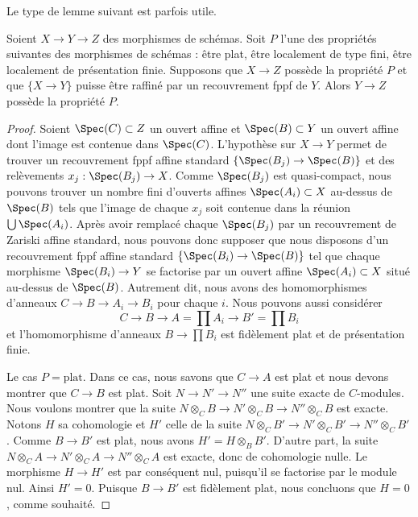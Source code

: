 \noindent
Le type de lemme suivant est parfois utile.

\begin{lemma}
\label{lemma-curiosity}
Soient $X \to Y \to Z$ des morphismes de schémas.
Soit $P$ l'une des propriétés suivantes des morphismes de schémas :
être plat, être localement de type fini, être localement de présentation
finie. Supposons que $X \to Z$ possède la propriété $P$ et que
$\{X \to Y\}$ puisse être raffiné par un recouvrement fppf de $Y$.
Alors $Y \to Z$ possède la propriété $P$.
\end{lemma}

\begin{proof}
Soient $\Spec(C) \subset Z$ un ouvert affine et
$\Spec(B) \subset Y$ un ouvert affine dont l'image est contenue dans
$\Spec(C)$. L'hypothèse sur $X \to Y$ permet de trouver un recouvrement
fppf affine standard $\{\Spec(B_j) \to \Spec(B)\}$ et des relèvements
$x_j : \Spec(B_j) \to X$. Comme $\Spec(B_j)$ est quasi-compact, nous
pouvons trouver un nombre fini d'ouverts affines
$\Spec(A_i) \subset X$ au-dessus de $\Spec(B)$ tels que l'image de
chaque $x_j$ soit contenue dans la réunion $\bigcup \Spec(A_i)$.
Après avoir remplacé chaque $\Spec(B_j)$ par un recouvrement de Zariski
affine standard, nous pouvons donc supposer que nous disposons d'un
recouvrement fppf affine standard
$\{\Spec(B_i) \to \Spec(B)\}$ tel que chaque morphisme
$\Spec(B_i) \to Y$ se factorise par un ouvert affine
$\Spec(A_i) \subset X$ situé au-dessus de $\Spec(B)$. Autrement dit,
nous avons des homomorphismes d'anneaux $C \to B \to A_i \to B_i$
pour chaque $i$. Nous pouvons aussi considérer
$$
C \to B \to A = \prod A_i \to B' = \prod B_i
$$
et l'homomorphisme d'anneaux $B \to \prod B_i$ est fidèlement plat et
de présentation finie.

\medskip\noindent
Le cas $P = \text{plat}$. Dans ce cas, nous savons que $C \to A$ est plat et
nous devons montrer que $C \to B$ est plat. Soit
$N \to N' \to N''$ une suite exacte de $C$-modules. Nous voulons
montrer que la suite
$N \otimes_C B \to N' \otimes_C B \to N'' \otimes_C B$ est exacte.
Notons $H$ sa cohomologie et $H'$ celle de la suite
$N \otimes_C B' \to N' \otimes_C B' \to N'' \otimes_C B'$.
Comme $B \to B'$ est plat, nous avons $H' = H \otimes_B B'$.
D'autre part, la suite
$N \otimes_C A \to N' \otimes_C A \to N'' \otimes_C A$ est exacte,
donc de cohomologie nulle. Le morphisme $H \to H'$ est par conséquent
nul, puisqu'il se factorise par le module nul. Ainsi $H' = 0$.
Puisque $B \to B'$ est fidèlement plat, nous concluons que $H = 0$,
comme souhaité.


\end{proof}
